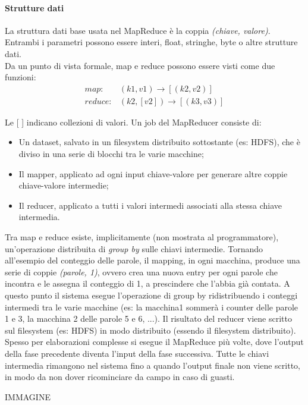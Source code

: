 \documentclass{article}
\begin{document}
\paragraph*{Strutture dati} La struttura dati base usata nel MapReduce è la coppia \textit{(chiave, valore)}. Entrambi i parametri possono essere interi, float, stringhe, byte o altre strutture dati.
\\

\noindent Da un punto di vista formale, map e reduce possono essere visti come due funzioni:
\begin{align*}
    map:& (k1, v1) \rightarrow [(k2, v2)]\\
    reduce:& (k2, [v2]) \rightarrow [(k3, v3)]
\end{align*}

Le [ ] indicano collezioni di valori. Un job del MapReducer consiste di:
\begin{itemize}
    \item Un dataset, salvato in un filesystem distribuito sottostante (es: HDFS), che è diviso in una serie di blocchi tra le varie macchine;
    \item Il mapper, applicato ad ogni input chiave-valore per generare altre coppie chiave-valore intermedie;
    \item Il reducer, applicato a tutti i valori intermedi associati alla stessa chiave intermedia.
\end{itemize}

Tra map e reduce esiste, implicitamente (non mostrata al programmatore), un'operazione distribuita di \textit{group by} sulle chiavi intermedie. Tornando all'esempio del conteggio delle parole, il mapping, in ogni macchina, produce una serie di coppie \textit{(parole, 1)}, ovvero crea una nuova entry per ogni parole che incontra e le assegna il conteggio di 1, a prescindere che l'abbia già contata. A questo punto il sistema esegue l'operazione di group by ridistribuendo i conteggi intermedi tra le varie macchine (es: la macchina1 sommerà i counter delle parole 1 e 3, la macchina 2 delle parole 5 e 6, ...). 
Il risultato del reducer viene scritto sul filesystem (es: HDFS) in modo distribuito (essendo il filesystem distribuito). Spesso per elaborazioni complesse si esegue il MapReduce più volte, dove l'output della fase precedente diventa l'input della fase successiva. Tutte le chiavi intermedia rimangono nel sistema fino a quando l'output finale non viene scritto, in modo da non dover ricominciare da campo in caso di guasti. 

IMMAGINE
\end{document}
